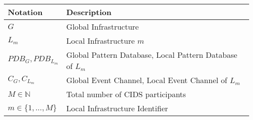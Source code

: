 
\begin{tabular}{ll} 
    \toprule
    \textbf{Notation} & \textbf{Description}             \\ 
    \midrule
    $G$                     & Global Infrastructure            \\
    $L_m$                   & Local Infrastructure $m$             \\
    \midrule
    $PDB_G, PDB_{L_m}$                   & Global Pattern Database, Local Pattern Database of $L_m$             \\
    $C_G, C_{L_m}$                     & Global Event Channel, Local Event Channel of $L_m$                    \\
    \midrule
    $M \in \mathbb{N}$      & Total number of CIDS participants         \\
    $m \in \{1, \dots, M\}  $         & Local Infrastructure Identifier  \\
    \bottomrule
\end{tabular}
